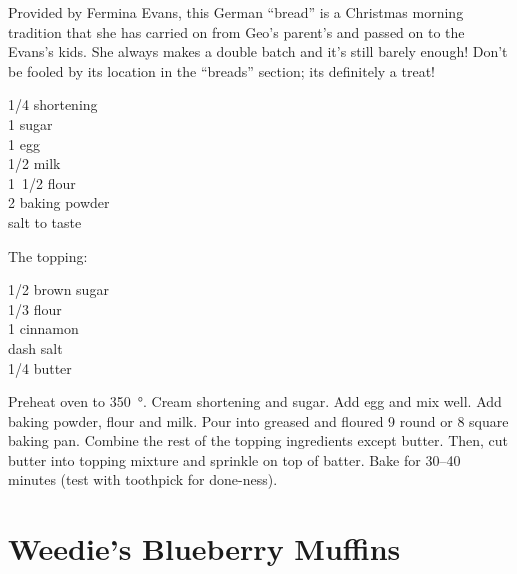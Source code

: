 \begin{open}
  Provided by Fermina Evans, this German ``bread'' is a Christmas morning tradition that she has carried on from Geo's parent's and passed on to the Evans's kids. She always makes a double batch and it's still barely enough! Don't be fooled by its location in the ``breads'' section; its
  definitely a treat!
\end{open}
\begin{ingredients}
  \SI{1/4}{\cup} shortening\\
  \SI{1}{\cup} sugar \\
  1 egg \\
  \SI{1/2}{\cup} milk \\
  \SI{1/2}[1]{\cup} flour \\
  \SI{2}{\teaspoon} baking powder \\
  salt to taste
\end{ingredients}
The topping:
\begin{ingredients}
  \SI{1/2}{\cup} brown sugar \\
  \SI{1/3}{\cup} flour \\
  \SI{1}{\teaspoon} cinnamon \\
  dash salt\\
  \SI{1/4}{\cup} butter
\end{ingredients}
Preheat oven to \SI{350}{\degree}. Cream shortening and sugar. Add egg and mix
well.  Add baking powder, flour and milk. Pour into greased and floured \SI{9}{\inch} round
or \SI{8}{\inch} square baking pan. Combine the rest of the topping
ingredients except butter. Then, cut butter into topping mixture and sprinkle
on top of batter. Bake for \numrange{30}{40} minutes (test with toothpick for done-ness).

\section{Weedie's Blueberry Muffins}

